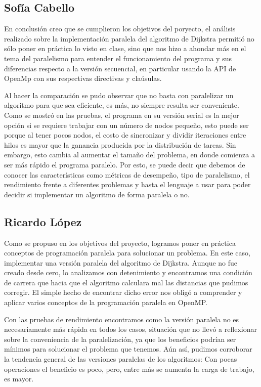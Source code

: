 \documentclass[11pt]{article}
\begin{document}
\subsection{Sofía Cabello}
En conclusión creo que se cumplieron los objetivos del poryecto, el análisis realizado sobre la implementación paralela del algoritmo de Dijkstra permitió no sólo poner en práctica lo visto en clase, sino que nos hizo a ahondar más en el tema del paralelismo para entender el funcionamiento del programa y sus diferencias respecto a la versión secuencial, en particular usando la API de OpenMp con sus respectivas directivas y claúsulas. 
\par
Al hacer la comparación se pudo observar que no basta  con paralelizar un algoritmo para que sea eficiente, es más, no siempre resulta ser conveniente. Como se mostró en las pruebas, el programa en su versión serial es la mejor opción si se requiere trabajar con un número de nodos pequeño, esto puede ser porque al tener pocos nodos, el costo de sincronizar y dividir iteraciones entre hilos es mayor que la ganancia producida por la distribución de tareas. Sin embargo, esto cambia al aumentar el tamaño del problema, en donde comienza a ser más rápido el programa paralelo. Por esto, se puede decir que debemos de conocer las características como métricas de desempeño, tipo de paralelismo, el rendimiento frente a diferentes problemas y hasta el lenguaje a usar para poder decidir si implementar un algoritmo de forma paralela o no.  
\subsection{Ricardo López}

Como se propuso en los objetivos del proyecto, logramos poner en práctica conceptos de programación paralela para solucionar un problema. En este caso, implementar una versión paralela del algoritmo de Dijkstra. Aunque no fue creado desde cero, lo analizamos con detenimiento y encontramos una condición de carrera que hacia que el algoritmo calculara mal las distancias que pudimos corregir. El simple hecho de encontrar dicho error nos obligó a comprender y aplicar varios conceptos de la programación paralela en OpenMP.
\par 
Con las pruebas de rendimiento encontramos como la versión paralela no es necesariamente más rápida en todos los casos, situación que no llevó a reflexionar sobre la conveniencia de la paralelización, ya que los beneficios  podrían ser  mínimos para solucionar el problema que tenemos. Aún así, pudimos corroborar la tendencia general de las versiones paralelas de los algoritmos: Con pocas operaciones el beneficio es poco, pero, entre más se aumenta la carga de trabajo, es mayor. 
\end{document}
